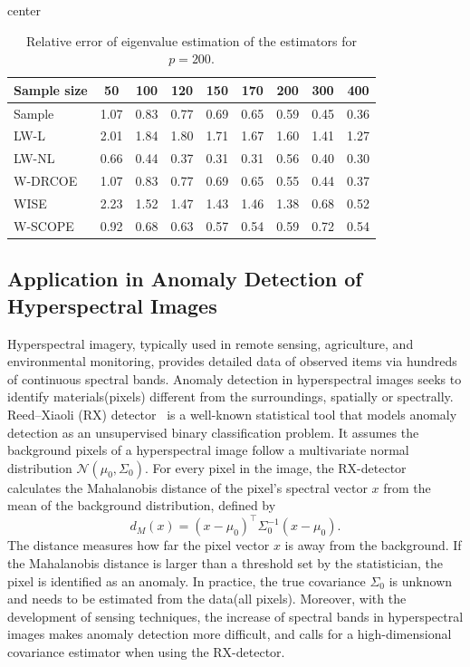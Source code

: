 \documentclass[11pt]{article}
\def\transpose{\top}
\begin{document}
\begin{table}[H]
\begin{adjustbox}{center}
\begin{tabular}{lcccccccc}
\hline
Sample size & 50 & 100 & 120 & 150 & 170 & 200 & 300 & 400 \\
\hline
Sample     & 1.07 & 0.83 & 0.77 & 0.69 & 0.65 & 0.59 & 0.45 & 0.36 \\
LW-L     & 2.01 & 1.84 & 1.80 & 1.71 & 1.67 & 1.60 & 1.41 & 1.27 \\
LW-NL    & 0.66 & 0.44 & 0.37 & 0.31 & 0.31 & 0.56 & 0.40 & 0.30 \\
W-DRCOE  & 1.07 & 0.83 & 0.77 & 0.69 & 0.65 & 0.55 & 0.44 & 0.37 \\
WISE     & 2.23 & 1.52 & 1.47 & 1.43 & 1.46 & 1.38 & 0.68 & 0.52 \\
W-SCOPE     & 0.92 & 0.68 & 0.63 & 0.57 & 0.54 & 0.59 & 0.72 & 0.54 \\
\hline
\end{tabular}
\end{adjustbox}
\caption{Relative error of eigenvalue estimation of the estimators for $p=200$. }
\label{tab:EigErr-p=200}
\end{table}

\subsection{Application in Anomaly Detection of Hyperspectral Images}
Hyperspectral imagery, typically used in remote sensing, agriculture, and environmental monitoring, provides detailed data of observed items via hundreds of continuous spectral bands.
Anomaly detection in hyperspectral images seeks to identify materials(pixels) different from the surroundings, spatially or spectrally. Reed–Xiaoli (RX) detector~\citep{ref:reed1990adaptive} is a well-known statistical tool that models anomaly detection as an unsupervised binary classification problem. It assumes the background pixels of a hyperspectral image follow a multivariate normal distribution $\mathcal{N}(\mu_0, \Sigma_0)$. For every pixel in the image, the RX-detector calculates the Mahalanobis distance of the pixel's spectral vector $x$ from the mean of the background distribution, defined by
\[
    d_M(x) = (x-\mu_0)^\transpose \Sigma_0^{-1} (x-\mu_0). 
\] 
The distance measures how far the pixel vector $x$ is away from the background. If the Mahalanobis distance is larger than a threshold set by the statistician, the pixel is identified as an anomaly. In practice, the true covariance $\Sigma_0$ is unknown and needs to be estimated from the data(all pixels). Moreover, with the development of sensing techniques, the increase of spectral bands in hyperspectral images makes anomaly detection more difficult, and calls for a high-dimensional covariance estimator when using the RX-detector. 
\end{document}
